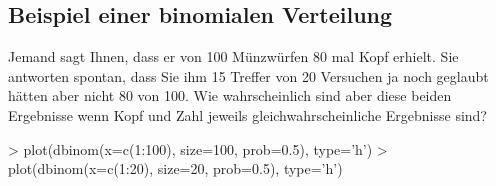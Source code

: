 \clearpage

\subsection{Beispiel einer binomialen Verteilung}
Jemand sagt Ihnen, dass er von 100 Münzwürfen 80 mal Kopf erhielt.
Sie antworten spontan, dass Sie ihm 15 Treffer von 20 Versuchen ja 
noch geglaubt hätten aber nicht 80 von 100. 
Wie wahrscheinlich sind aber diese beiden Ergebnisse wenn Kopf 
und Zahl jeweils gleichwahrscheinliche Ergebnisse sind?

\begin{Schunk}
\begin{Sinput}
> plot(dbinom(x=c(1:100), size=100, prob=0.5), type='h')
> plot(dbinom(x=c(1:20), size=20, prob=0.5), type='h')
\end{Sinput}
\end{Schunk}


